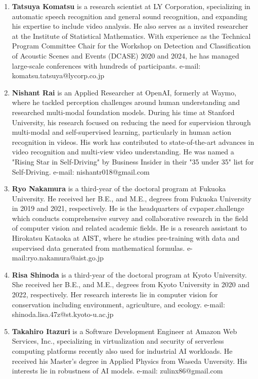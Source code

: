 \documentclass{article}
\begin{document}
\begin{enumerate}
    \item {\bf Tatsuya Komatsu} is a research scientist at LY Corporation, specializing in automatic speech recognition and general sound recognition, and expanding his expertise to include video analysis. He also serves as a invited researcher at the Institute of Statistical Mathematics. With experience as the Technical Program Committee Chair for the Workshop on Detection and Classification of Acoustic Scenes and Events (DCASE) 2020 and 2024, he has managed large-scale conferences with hundreds of participants. e-mail: komatsu.tatsuya@lycorp.co.jp

    \item {\bf Nishant Rai} is an Applied Researcher at OpenAI, formerly at Waymo, where he tackled perception challenges around human understanding and researched multi-modal foundation models. During his time at Stanford University, his research focused on reducing the need for supervision through multi-modal and self-supervised learning, particularly in human action recognition in videos. His work has contributed to state-of-the-art advances in video recognition and multi-view video understanding. He was named a "Rising Star in Self-Driving" by Business Insider in their "35 under 35" list for Self-Driving. e-mail: nishantr018@gmail.com

    \item {\bf Ryo Nakamura} is a third-year of the doctoral program at Fukuoka University. He received her B.E., and M.E., degrees from Fukuoka University in 2019 and 2021, respectively. He is the headquarters of cvpaper.challenge which conducts comprehensive survey and collaborative research in the field of computer vision and related academic fields. He is a research assistant to Hirokatsu Kataoka at AIST, where he studies pre-training with data and supervised data generated from mathematical formulas. e-mail:ryo.nakamura@aist.go.jp

    \item {\bf Risa Shinoda} is a third-year of the doctoral program at Kyoto University. She received her B.E., and M.E., degrees from Kyoto University in 2020 and 2022, respectively. Her research interests lie in computer vision for conservation including environment, agriculture, and ecology. e-mail: shinoda.lisa.47z@st.kyoto-u.ac.jp

    \item {\bf Takahiro Itazuri} is a Software Development Engineer at Amazon Web Services, Inc., specializing in virtualization and security of serverless computing platforms recently also used for industrial AI workloads. He received his Master's degree in Applied Physics from Waseda Unversity. His interests lie in robustness of AI models. e-mail: zulinx86@gmail.com


\end{enumerate}
\end{document}
